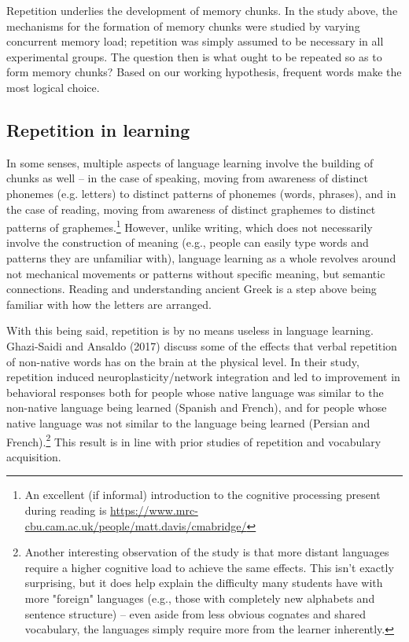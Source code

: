 \documentclass[11pt]{article}
\begin{document}
Repetition underlies the development of memory chunks. In the study above, the mechanisms for the formation of memory chunks were studied by varying concurrent memory load; repetition was simply assumed to be necessary in all experimental groups. The question then is what ought to be repeated so as to form memory chunks? Based on our working hypothesis, frequent words make the most logical choice.

\subsection{Repetition in learning}
\label{sec:orgf6b7c9d}

In some senses, multiple aspects of language learning involve the building of chunks as well -- in the case of speaking, moving from awareness of distinct phonemes (e.g. letters) to distinct patterns of phonemes (words, phrases), and in the case of reading, moving from awareness of distinct graphemes to distinct patterns of graphemes.\footnote{An excellent (if informal) introduction to the cognitive processing present during reading is \url{https://www.mrc-cbu.cam.ac.uk/people/matt.davis/cmabridge/}} However, unlike writing, which does not necessarily involve the construction of meaning (e.g., people can easily type words and patterns they are unfamiliar with), language learning as a whole revolves around not mechanical movements or patterns without specific meaning, but semantic connections. Reading and understanding ancient Greek is a step above being familiar with how the letters are arranged.

With this being said, repetition is by no means useless in language learning. Ghazi-Saidi and Ansaldo (2017) discuss some of the effects that verbal repetition of non-native words has on the brain at the physical level. In their study, repetition induced neuroplasticity/network integration and led to improvement in behavioral responses both for people whose native language was similar to the non-native language being learned (Spanish and French), and for people whose native language was not similar to the language being learned (Persian and French).\footnote{Another interesting observation of the study is that more distant languages require a higher cognitive load to achieve the same effects. This isn't exactly surprising, but it does help explain the difficulty many students have with more "foreign" languages (e.g., those with completely new alphabets and sentence structure) -- even aside from less obvious cognates and shared vocabulary, the languages simply require more from the learner inherently.} This result is in line with prior studies of repetition and vocabulary acquisition.
\end{document}
